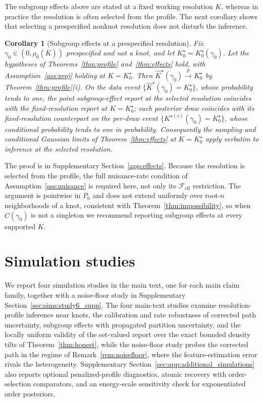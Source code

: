 \documentclass[11pt]{article}
\newtheorem{corollary}{Corollary}
\newcommand{\pto}{\overset{p}{\to}}
\newcommand{\calF}{\mathcal F}
\begin{document}
The subgroup effects above are stated at a fixed working resolution $K$, whereas in practice the resolution is often selected from the profile. The next corollary shows that selecting a prespecified nonknot resolution does not disturb the inference.

\begin{corollary}[Subgroup effects at a prespecified resolution]\label{cor:fixedgamma}
Fix $\gamma_0\in(0,\rho_0(\overline K))$ prespecified and not a knot, and let $K^\star_0=K^\star_0(\gamma_0)$. Let the hypotheses of Theorems~\ref{thm:profile} and~\ref{thm:effects} hold, with Assumption~\ref{ass:proj} holding at $K=K^\star_0$. Then $\widehat K^\star(\gamma_0)\pto K^\star_0$ by Theorem~\ref{thm:profile}\textup{(i)}. On the data event $\{\widehat K^\star(\gamma_0)=K^\star_0\}$, whose probability tends to one, the point subgroup-effect report at the selected resolution coincides with the fixed-resolution report at $K=K^\star_0$; each posterior draw coincides with its fixed-resolution counterpart on the per-draw event $\{K^{\star(s)}(\gamma_0)=K^\star_0\}$, whose conditional probability tends to one in probability. Consequently the sampling and conditional Gaussian limits of Theorem~\ref{thm:effects} at $K=K^\star_0$ apply verbatim to inference at the selected resolution.
\end{corollary}
The proof is in Supplementary Section~\ref{app:effects}. Because the resolution is selected from the profile, the full nuisance-rate condition of Assumption~\ref{ass:nuisance} is required here, not only its $\calF_{\mathrm{eff}}$ restriction. The argument is pointwise in $P_0$ and does not extend uniformly over root-$n$ neighborhoods of a knot, consistent with Theorem~\ref{thm:impossibility}, so when $\widehat C(\gamma_0)$ is not a singleton we recommend reporting subgroup effects at every supported $K$.

\section{Simulation studies}\label{sec:sims}

We report four simulation studies in the main text, one for each main claim family, together with a noise-floor study in Supplementary Section~\ref{sec:sims:study6_supp}. The four main-text studies examine resolution-profile inference near knots, the calibration and rate robustness of corrected path uncertainty, subgroup effects with propagated partition uncertainty, and the locally uniform validity of the set-valued report over the exact bounded density tilts of Theorem~\ref{thm:honest}, while the noise-floor study probes the corrected path in the regime of Remark~\ref{rem:noisefloor}, where the feature-estimation error rivals the heterogeneity. Supplementary Section~\ref{sec:app:additional_simulations} also reports optional penalized-profile diagnostics, atomic recovery with order-selection comparators, and an energy-scale sensitivity check for exponentiated order posteriors.
\end{document}
